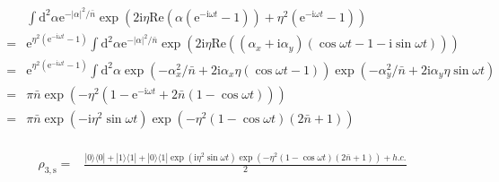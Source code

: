 \documentclass[10pt,fleqn]{article}
\newcommand{\ud}{\mathrm{d}}
\newcommand{\ue}{\mathrm{e}}
\newcommand{\ui}{\mathrm{i}}
\newcommand{\eqar}[1]
{
  \begin{align}
    #1
  \end{align}
}
\newcommand{\paren}[1]{{\left({#1}\right)}}
\newcommand{\abs}[1]{{\left|{#1}\right|}}
\begin{document}
\eqar{
  \begin{split}
    &\int\ud^2\alpha \ue^{-\abs{\alpha}^2/{\bar n}}\exp\paren{
      2\ui\eta\mathrm{Re}\paren{\alpha\paren{\ue^{-\ui\omega t}-1}}
      +\eta^2\paren{\ue^{-\ui\omega t}-1}
      }\\
    =&\ue^{\eta^2\paren{\ue^{-\ui\omega t}-1}}
       \int\ud^2\alpha \ue^{-\abs{\alpha}^2/{\bar n}}\exp\paren{
       2\ui\eta\mathrm{Re}\paren{\paren{\alpha_x+\ui\alpha_y}\paren{\cos\omega t-1-\ui\sin\omega t}}}\\
    =&\ue^{\eta^2\paren{\ue^{-\ui\omega t}-1}}
       \int\ud^2\alpha
       \exp\paren{
       -\alpha_x^2/{\bar n}
       +2\ui\alpha_x\eta\paren{\cos\omega t-1}
       }
       \exp\paren{
       -\alpha_y^2/{\bar n}
       +2\ui\alpha_y\eta\sin\omega t
       }\\
    =&\pi {\bar n}\exp\paren{-\eta^2\paren{1-\ue^{-\ui\omega t}+2{\bar n}\paren{1-\cos\omega t}}}\\
    =&\pi {\bar n}\exp\paren{-\ui\eta^2\sin\omega t}\exp\paren{-\eta^2\paren{1-\cos\omega t}\paren{2{\bar n}+1}}
  \end{split}
}

\eqar{
  \begin{split}
    \rho_{3,\mathrm{s}}=&\frac{|0\rangle\langle0|+|1\rangle\langle1|+|0\rangle\langle1|\exp\paren{\ui\eta^2\sin\omega t}\exp\paren{-\eta^2\paren{1-\cos\omega t}\paren{2{\bar n}+1}}+h.c.}{2}
  \end{split}
}
\end{document}

